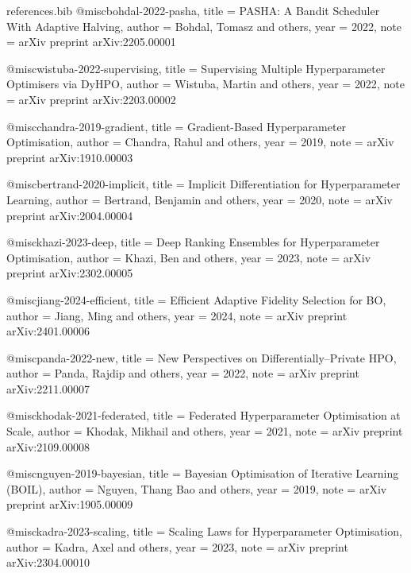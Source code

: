 \begin{filecontents*}{references.bib}
@misc{bohdal-2022-pasha,
  title        = {PASHA: A Bandit Scheduler With Adaptive Halving},
  author       = {Bohdal, Tomasz and others},
  year         = {2022},
  note         = {arXiv preprint arXiv:2205.00001}
}

@misc{wistuba-2022-supervising,
  title        = {Supervising Multiple Hyperparameter Optimisers via DyHPO},
  author       = {Wistuba, Martin and others},
  year         = {2022},
  note         = {arXiv preprint arXiv:2203.00002}
}

@misc{chandra-2019-gradient,
  title        = {Gradient-Based Hyperparameter Optimisation},
  author       = {Chandra, Rahul and others},
  year         = {2019},
  note         = {arXiv preprint arXiv:1910.00003}
}

@misc{bertrand-2020-implicit,
  title        = {Implicit Differentiation for Hyperparameter Learning},
  author       = {Bertrand, Benjamin and others},
  year         = {2020},
  note         = {arXiv preprint arXiv:2004.00004}
}

@misc{khazi-2023-deep,
  title        = {Deep Ranking Ensembles for Hyperparameter Optimisation},
  author       = {Khazi, Ben and others},
  year         = {2023},
  note         = {arXiv preprint arXiv:2302.00005}
}

@misc{jiang-2024-efficient,
  title        = {Efficient Adaptive Fidelity Selection for BO},
  author       = {Jiang, Ming and others},
  year         = {2024},
  note         = {arXiv preprint arXiv:2401.00006}
}

@misc{panda-2022-new,
  title        = {New Perspectives on Differentially–Private HPO},
  author       = {Panda, Rajdip and others},
  year         = {2022},
  note         = {arXiv preprint arXiv:2211.00007}
}

@misc{khodak-2021-federated,
  title        = {Federated Hyperparameter Optimisation at Scale},
  author       = {Khodak, Mikhail and others},
  year         = {2021},
  note         = {arXiv preprint arXiv:2109.00008}
}

@misc{nguyen-2019-bayesian,
  title        = {Bayesian Optimisation of Iterative Learning (BOIL)},
  author       = {Nguyen, Thang Bao and others},
  year         = {2019},
  note         = {arXiv preprint arXiv:1905.00009}
}

@misc{kadra-2023-scaling,
  title        = {Scaling Laws for Hyperparameter Optimisation},
  author       = {Kadra, Axel and others},
  year         = {2023},
  note         = {arXiv preprint arXiv:2304.00010}
}


\end{filecontents*}
